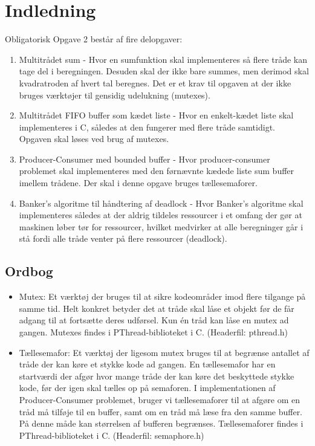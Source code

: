\section{Indledning}
Obligatorisk Opgave 2 består af fire delopgaver:

\begin{enumerate}
	\item Multitrådet sum - Hvor en sumfunktion skal implementeres så flere tråde kan tage del i beregningen. Desuden skal der ikke bare summes, men derimod skal kvadratroden af hvert tal beregnes. Det er et krav til opgaven at der ikke bruges værktøjer til gensidig udelukning (mutexes).
	\item Multitrådet FIFO buffer som kædet liste - Hvor en enkelt-kædet liste skal implementeres i C, således at den fungerer med flere tråde samtidigt. Opgaven skal løses ved brug af mutexes.
	\item Producer-Consumer med bounded buffer - Hvor producer-consumer problemet skal implementeres med den førnævnte kædede liste sum buffer imellem trådene. Der skal i denne opgave bruges tællesemaforer.
	\item Banker's algoritme til håndtering af deadlock - Hvor Banker's algoritme skal implementeres således at der aldrig tildeles ressourcer i et omfang der gør at maskinen løber tør for ressourcer, hvilket medvirker at alle beregninger går i stå fordi alle tråde venter på flere ressourcer (deadlock).
\end{enumerate}

\subsection{Ordbog}
\begin{itemize}
	\item Mutex: Et værktøj der bruges til at sikre kodeområder imod flere tilgange på samme tid. Helt konkret betyder det at tråde skal låse et objekt før de får adgang til at fortsætte deres udførsel. Kun én tråd kan låse en mutex ad gangen. Mutexes findes i PThread-biblioteket i C. (Headerfil: pthread.h)
	\item Tællesemafor: Et værktøj der ligesom mutex bruges til at begrænse antallet af tråde der kan køre et stykke kode ad gangen. En tællesemafor har en startværdi der afgør hvor mange tråde der kan køre det beskyttede stykke kode, før der igen skal tælles op på semaforen. I implementationen af Producer-Consumer problemet, bruger vi tællesemaforer til at afgøre om en tråd må tilføje til en buffer, samt om en tråd må læse fra den samme buffer. På denne måde kan størrelsen af bufferen begrænses. Tællesemaforer findes i PThread-biblioteket i C. (Headerfil: semaphore.h)
\end{itemize}
